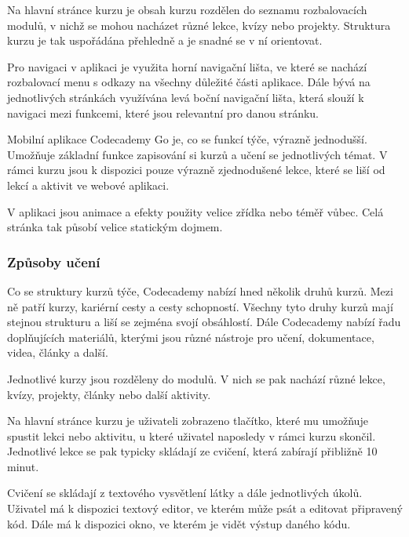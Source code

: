 Na hlavní stránce kurzu je obsah kurzu rozdělen do seznamu rozbalovacích modulů, v nichž se mohou nacházet různé lekce, kvízy nebo projekty. Struktura kurzu je tak uspořádána přehledně a je snadné se v ní orientovat.

Pro navigaci v aplikaci je využita horní navigační lišta, ve které se nachází rozbalovací menu s odkazy na všechny důležité části aplikace. Dále bývá na jednotlivých stránkách využívána levá boční navigační lišta, která slouží k navigaci mezi funkcemi, které jsou relevantní pro danou stránku.

Mobilní aplikace Codecademy Go je, co se funkcí týče, výrazně jednodušší. Umožňuje základní funkce zapisování si kurzů a učení se jednotlivých témat. V rámci kurzu jsou k dispozici pouze výrazně zjednodušené lekce, které se liší od lekcí a aktivit ve webové aplikaci.

V aplikaci jsou animace a efekty použity velice zřídka nebo téměř vůbec. Celá stránka tak působí velice statickým dojmem. 

\subsubsection{Způsoby učení}

Co se struktury kurzů týče, Codecademy nabízí hned několik druhů kurzů. Mezi ně patří kurzy, kariérní cesty a cesty schopností. Všechny tyto druhy kurzů mají stejnou strukturu a liší se zejména svojí obsáhlostí. Dále Codecademy nabízí řadu doplňujících materiálů, kterými jsou různé nástroje pro učení, dokumentace, videa, články a další.

Jednotlivé kurzy jsou rozděleny do modulů. V nich se pak nachází různé lekce, kvízy, projekty, články nebo další aktivity.

Na hlavní stránce kurzu je uživateli zobrazeno tlačítko, které mu umožňuje spustit lekci nebo aktivitu, u které uživatel naposledy v rámci kurzu skončil. Jednotlivé lekce se pak typicky skládají ze cvičení, která zabírají přibližně 10 minut.

Cvičení se skládají z textového vysvětlení látky a dále jednotlivých úkolů. Uživatel má k dispozici textový editor, ve kterém může psát a editovat připravený kód. Dále má k dispozici okno, ve kterém je vidět výstup daného kódu.


